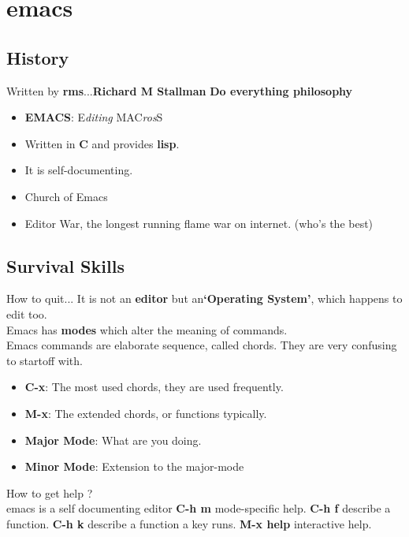 \documentclass{beamer}
\begin{document}
\section{emacs}

\subsection{History}
\begin{frame}{Written by \textbf{rms}...}{\textbf{Richard M Stallman}}
	\textbf{Do everything philosophy} \pause
	\pause
	\begin{itemize}
		\item {
				\textbf{EMACS}: \alert{E}\textit{diting} \alert{MAC}\textit{ros}\alert{S}
				\pause

			}
		\item {
				Written in \textbf{C} and provides \textbf{lisp}.
				\pause

			}
		\item {
				It is self-documenting.
				\pause
			}
		\item {
				Church of Emacs
				\pause
			}
		\item {
				Editor War, the longest running flame war on internet. (who's the best)

			}
	\end{itemize}
\end{frame}

\subsection{Survival Skills}
\begin{frame}{How to quit...}
	It is not an \textbf{editor} but an\textbf{`Operating System'}, which happens to edit too.\\
	Emacs has \textbf{modes} which alter the meaning of commands. \\
	Emacs commands are elaborate sequence, called \alert{chords}. They are very confusing to startoff with.
	\begin{itemize}
		\item {
			\textbf{C-x}: The most used chords, they are used frequently.
			\pause
			}

		\item {   
			\textbf{M-x}: The extended chords, or functions typically.
			\pause

			}
		\item {
			\textbf{Major Mode}: What are you doing.
			\pause
			}
		\item {
			\textbf{Minor Mode}: Extension to the major-mode
			\pause
			}
	\end{itemize}
	How to get \alert{help }?\\ \pause
	emacs is a self documenting editor
	\textbf{C-h m} mode-specific help.
	\textbf{C-h f} describe a function.
	\textbf{C-h k} describe a function a key runs.
	\textbf{M-x help} interactive help.

\end{frame}
\end{document}
